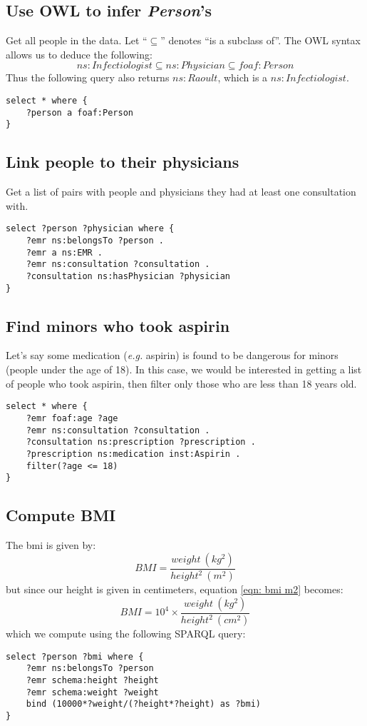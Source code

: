 \documentclass[12pt]{article}
\begin{document}
\subsection{Use OWL to infer \textit{Person}'s}
Get all people in the data. Let ``\(\subseteq\)'' denotes ``is a subclass of''. The OWL syntax allows us to deduce the following:
\begin{equation}
    ns:Infectiologist \subseteq ns:Physician \subseteq foaf:Person
\end{equation}
Thus the following query also returns \(ns:Raoult\), which is a \(ns:Infectiologist\).
\begin{verbatim}
select * where {
    ?person a foaf:Person
}
\end{verbatim}

\subsection{Link people to their physicians}
Get a list of pairs with people and physicians they had at least one consultation with.
\begin{verbatim}
select ?person ?physician where {
    ?emr ns:belongsTo ?person .
    ?emr a ns:EMR .
    ?emr ns:consultation ?consultation .
    ?consultation ns:hasPhysician ?physician
}
\end{verbatim}

\subsection{Find minors who took aspirin}
Let's say some medication (\textit{e.g.} aspirin) is found to be dangerous for minors (people under the age of 18). In this case, we would be interested in getting a list of people who took aspirin, then filter only those who are less than 18 years old.
\begin{verbatim}
select * where {
    ?emr foaf:age ?age
    ?emr ns:consultation ?consultation .
    ?consultation ns:prescription ?prescription .
    ?prescription ns:medication inst:Aspirin .
    filter(?age <= 18)
}
\end{verbatim}
  
\subsection{Compute BMI}
The \gls{bmi} is given by:
\begin{equation}
    \label{eqn: bmi m2}
    BMI = \frac{weight\ (kg^2)}{height^2\ (m^2)}
\end{equation}
but since our height is given in centimeters, equation \eqref{eqn: bmi m2} becomes:
\begin{equation}
    \label{eqn: bmi cm2}
    BMI = 10^4 \times \frac{weight\ (kg^2)}{height^2\ (cm^2)}
\end{equation}
which we compute using the following SPARQL query:
\begin{verbatim}
select ?person ?bmi where {
    ?emr ns:belongsTo ?person
    ?emr schema:height ?height
    ?emr schema:weight ?weight
    bind (10000*?weight/(?height*?height) as ?bmi)
}
\end{verbatim}
        
\end{document}
